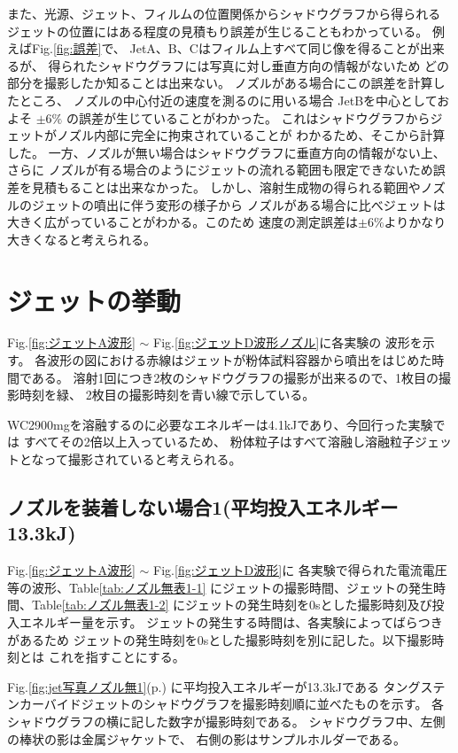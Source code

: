 また、光源、ジェット、フィルムの位置関係からシャドウグラフから得られる
ジェットの位置にはある程度の見積もり誤差が生じることもわかっている。
例えばFig.\ref{fig:誤差}で、
JetA、B、Cはフィルム上すべて同じ像を得ることが出来るが、
得られたシャドウグラフには写真に対し垂直方向の情報がないため
どの部分を撮影したか知ることは出来ない。
ノズルがある場合にこの誤差を計算したところ、
ノズルの中心付近の速度を測るのに用いる場合
JetBを中心としておよそ $\pm 6\%$ の誤差が生じていることがわかった。
これはシャドウグラフからジェットがノズル内部に完全に拘束されていることが
わかるため、そこから計算した。
一方、ノズルが無い場合はシャドウグラフに垂直方向の情報がない上、さらに
ノズルが有る場合のようにジェットの流れる範囲も限定できないため誤差を見積もることは出来なかった。
しかし、溶射生成物の得られる範囲やノズルのジェットの噴出に伴う変形の様子から
ノズルがある場合に比べジェットは大きく広がっていることがわかる。このため
速度の測定誤差は$\pm 6\%$よりかなり大きくなると考えられる。


\section{ジェットの挙動}

Fig.\ref{fig:ジェットA波形} $\sim$ Fig.\ref{fig:ジェットD波形ノズル}に各実験の
波形を示す。
各波形の図における赤線はジェットが粉体試料容器から噴出をはじめた時間である。
溶射1回につき2枚のシャドウグラフの撮影が出来るので、1枚目の撮影時刻を緑、
2枚目の撮影時刻を青い線で示している。

WC2900mgを溶融するのに必要なエネルギーは4.1kJであり、今回行った実験では
すべてその2倍以上入っているため、
粉体粒子はすべて溶融し溶融粒子ジェットとなって撮影されていると考えられる。


\subsection{ノズルを装着しない場合1(平均投入エネルギー13.3kJ)}\label{ノズル無1}

Fig.\ref{fig:ジェットA波形} $\sim$ Fig.\ref{fig:ジェットD波形}に
各実験で得られた電流電圧等の波形、Table\ref{tab:ノズル無表1-1}
にジェットの撮影時間、ジェットの発生時間、Table\ref{tab:ノズル無表1-2}
にジェットの発生時刻を0sとした撮影時刻及び投入エネルギー量を示す。
ジェットの発生する時間は、各実験によってばらつきがあるため
ジェットの発生時刻を0sとした撮影時刻を別に記した。以下撮影時刻とは
これを指すことにする。

Fig.\ref{fig:jet写真ノズル無1}(p.\pageref{fig:jet写真ノズル無1})
 に平均投入エネルギーが13.3kJである
タングステンカーバイドジェットのシャドウグラフを撮影時刻順に並べたものを示す。
各シャドウグラフの横に記した数字が撮影時刻である。
シャドウグラフ中、左側の棒状の影は金属ジャケットで、
右側の影はサンプルホルダーである。

